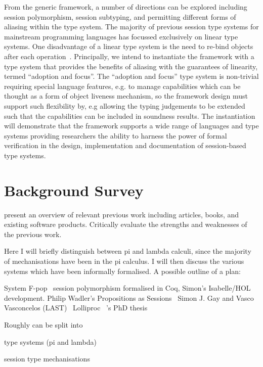 \documentclass{mprop}
\begin{document}
From the generic framework, a number of directions can be explored including
session polymorphism, session subtyping, and permitting different forms of
aliasing within the type system. The majority of previous session type systems
for mainstream programming languages has focussed exclusively on linear type
systems. One disadvantage of a linear type system is the need to re-bind
objects after each operation~\cite{Gay:2010:LAST}. Principally, we intend to
instantiate the framework with a type system that provides the benefits of
aliasing with the guarantees of linearity, termed ``adoption and focus''. The
``adoption and focus'' type system is non-trivial requiring special language
features, e.g. to manage capabilities which can be thought as a form of object
liveness mechanism, so the framework design must support such flexibility by,
e.g allowing the typing judgements to be extended such that the capabilities
can be included in soundness results. The instantiation will demonstrate that
the framework supports a wide range of languages and type systems providing
researchers the ability to harness the power of formal verification in the
design, implementation and documentation of session-based type systems.

\section{Background Survey}

present an overview of relevant previous work including articles, books, and
existing software products. Critically evaluate the strengths and weaknesses
of the previous work.

Here I will briefly distinguish between pi and lambda calculi, since the majority of mechanisations have been in the pi calculus. I will then discuss the various systems which have been informally formalised. A possible outline of a plan:

System F-pop~\cite{Mazurak:2010:LLT}
session polymorphism formalised in Coq, Simon's Isabelle/HOL
development.
Philip Wadler's Propositions as Sessions~\cite{Wadler:2012}
Simon J. Gay and Vasco Vasconcelos (LAST)~\cite{Gay:2010:LAST}
Lolliproc~\cite{Mazurak:2010:LCC}
\citeauthor{Mazurak:2013:LPP}'s PhD thesis~\cite{Mazurak:2013:LPP}

Roughly can be split into

type systems (pi and lambda)

session type mechanisations
\end{document}
